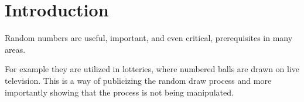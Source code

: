 \section{Introduction}\label{cha:introduction}

Random numbers are useful, important, and even critical, prerequisites in many areas.

 For example they are utilized in lotteries, where numbered balls are drawn on live television. This is a way of publicizing the random draw process and more importantly showing that the process is not being manipulated.




